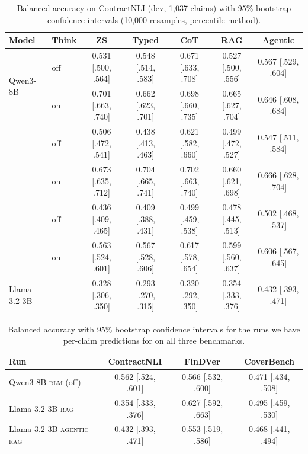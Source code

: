 \documentclass[11pt]{article}
\begin{document}
\begin{table}[H]
\centering
\footnotesize
\setlength{\tabcolsep}{4pt}
\begin{tabular}{llccccc}
\toprule
\textbf{Model} & \textbf{Think} & \textbf{ZS} & \textbf{Typed} & \textbf{CoT} & \textbf{RAG} & \textbf{Agentic} \\
\midrule
\multirow{2}{*}{Qwen3-8B}
 & off & 0.531 [.500, .564] & 0.548 [.514, .583] & 0.671 [.633, .708] & 0.527 [.500, .556] & 0.567 [.529, .604] \\
 & on  & 0.701 [.663, .740] & 0.662 [.623, .701] & 0.698 [.660, .735] & 0.665 [.627, .704] & 0.646 [.608, .684] \\
\addlinespace[2pt]
\multirow{2}{*}{Qwen3-4B}
 & off & 0.506 [.472, .541] & 0.438 [.413, .463] & 0.621 [.582, .660] & 0.499 [.472, .527] & 0.547 [.511, .584] \\
 & on  & 0.673 [.635, .712] & 0.704 [.665, .741] & 0.702 [.663, .740] & 0.660 [.621, .698] & 0.666 [.628, .704] \\
\addlinespace[2pt]
\multirow{2}{*}{Qwen3-1.7B}
 & off & 0.436 [.409, .465] & 0.409 [.388, .431] & 0.499 [.459, .538] & 0.478 [.445, .513] & 0.502 [.468, .537] \\
 & on  & 0.563 [.524, .601] & 0.567 [.528, .606] & 0.617 [.578, .654] & 0.599 [.560, .637] & 0.606 [.567, .645] \\
\addlinespace[2pt]
Llama-3.2-3B & -- & 0.328 [.306, .350] & 0.293 [.270, .315] & 0.320 [.292, .350] & 0.354 [.333, .376] & 0.432 [.393, .471] \\
\bottomrule
\end{tabular}
\caption{Balanced accuracy on ContractNLI (dev, 1{,}037 claims) with 95\%
bootstrap confidence intervals (10{,}000 resamples, percentile method).}
\label{tab:cnli_ci}
\end{table}

\begin{table}[H]
\centering
\footnotesize
\setlength{\tabcolsep}{6pt}
\begin{tabular}{lccc}
\toprule
\textbf{Run} & \textbf{ContractNLI} & \textbf{FinDVer} & \textbf{CoverBench} \\
\midrule
Qwen3-8B \textsc{rlm} (off)      & 0.562 [.524, .601] & 0.566 [.532, .600] & 0.471 [.434, .508] \\
Llama-3.2-3B \textsc{rag}         & 0.354 [.333, .376] & 0.627 [.592, .663] & 0.495 [.459, .530] \\
Llama-3.2-3B \textsc{agentic rag} & 0.432 [.393, .471] & 0.553 [.519, .586] & 0.468 [.441, .494] \\
\bottomrule
\end{tabular}
\caption{Balanced accuracy with 95\% bootstrap confidence intervals for
the runs we have per-claim predictions for on all three benchmarks.}
\label{tab:other_ci}
\end{table}
\end{document}
